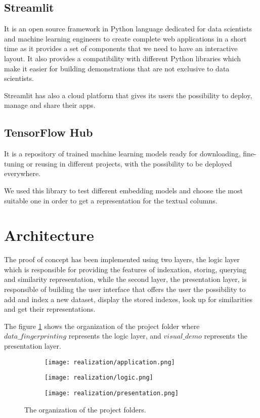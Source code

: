 \subsection{Streamlit}
It is an open source framework in Python language dedicated for data scientists
and machine learning engineers to create complete web applications in a short
time as it provides a set of components that we need to have an interactive
layout. It also provides a compatibility with different Python libraries which
make it easier for building demonstrations that are not exclusive to data
scientists.

Streamlit has also a cloud platform that gives its users the possibility to
deploy, manage and share their apps.

\subsection{TensorFlow Hub}
It is a repository of trained machine learning models ready for downloading,
fine-tuning or reusing in different projects, with the possibility to be deployed
everywhere.

We used this library to test different embedding models and choose the most
suitable one in order to get a representation for the textual columns.


\section{Architecture}
The proof of concept has been implemented using two layers, the logic layer
which is responsible for providing the features of indexation, storing, querying
and similarity representation, while the second layer, the presentation layer,
is responsible of building the user interface that offers the user the
possibility to add and index a new dataset, display the stored indexes, look up
for similarities and get their representations.

The figure \ref{fig:folder_organization} shows the organization of the project
folder where $data\_fingerprinting$ represents the logic layer, and
$visual\_demo$ represents the presentation layer.

\begin{figure}[h]
    \begin{subfigure}{.4\textwidth}
        \centering
        \texttt{[image: realization/application.png]}
    \end{subfigure}
    \begin{subfigure}{.4\textwidth}
        \centering
        \texttt{[image: realization/logic.png]}
    \end{subfigure}
    \begin{subfigure}{.4\textwidth}
        \centering
        \texttt{[image: realization/presentation.png]}
    \end{subfigure}
    \caption{The organization of the project folders.}
    \label{fig:folder_organization}
\end{figure}

